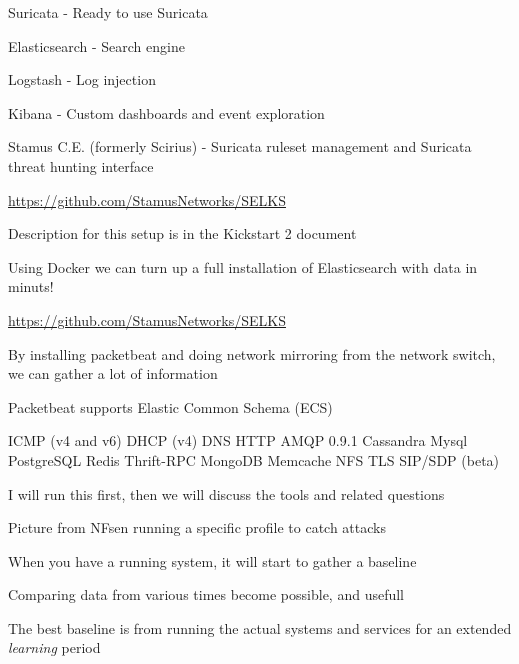 \documentclass[Screen16to9,17pt]{foils}
\begin{document}
\begin{list2}
\item Suricata - Ready to use Suricata
\item Elasticsearch - Search engine
\item Logstash - Log injection
\item Kibana - Custom dashboards and event exploration
\item Stamus C.E. (formerly Scirius) - Suricata ruleset management and Suricata threat hunting interface
\end{list2}
\url{https://github.com/StamusNetworks/SELKS}



\begin{list2}
\item Description for this setup is in the Kickstart 2 document
\item Using Docker we can turn up a full installation of Elasticsearch with data in minuts!
\item \url{https://github.com/StamusNetworks/SELKS}
\end{list2}





\begin{list2}
\item By installing packetbeat and doing network mirroring from the network switch, we can gather a lot of information
\item Packetbeat supports Elastic Common Schema (ECS) 
\item ICMP (v4 and v6)
DHCP (v4)
DNS
HTTP
AMQP 0.9.1
Cassandra
Mysql
PostgreSQL
Redis
Thrift-RPC
MongoDB
Memcache
NFS
TLS
SIP/SDP (beta)
\end{list2}




{\Large I will run this first, then we will discuss the tools and related questions}



\begin{list2}
\item Picture from NFsen running a specific profile to catch attacks
\item When you have a running system, it will start to gather a baseline
\item Comparing data from various times become possible, and usefull
\item The best baseline is from running the actual systems and services for an extended \emph{learning} period
\end{list2}
\end{document}
